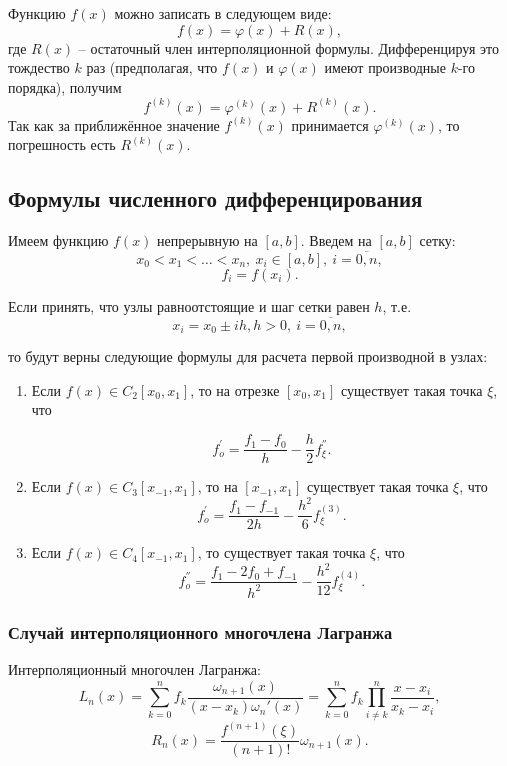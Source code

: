 \documentclass[
11pt,
master, %
subf, %
href, %
colorlinks=true, %
times, %
]{disser}
\begin{document}
Функцию $f(x)$ можно записать в следующем виде:
$$f(x) = \varphi(x) + R(x),$$
где $R(x)$ -- остаточный член интерполяционной формулы. Дифференцируя это тождество $k$ раз (предполагая, что $f(x)$ и $\varphi(x)$ имеют производные $k$-го порядка), получим
$$f^{(k)}(x) = \varphi^{(k)}(x) + R^{(k)}(x).$$
Так как за приближённое значение $f^{(k)}(x)$ принимается $\varphi^{(k)}(x)$, то погрешность есть $R^{(k)}(x)$.

\subsection{Формулы численного дифференцирования}
Имеем функцию $f(x)$ непрерывную на $[a,b]$. Введем на $[a,b]$ сетку:
$$x_0<x_1<\ldots<x_n, ~ x_i\in[a,b], ~ i=\overline{0,n},$$
$$f_i = f(x_i).$$

Если принять, что узлы равноотстоящие и шаг сетки равен $h$, т.е.
\begin{equation}
x_i=x_0 \pm ih, h>0, ~ i=\overline{0,n},
\end{equation}

то будут верны следующие формулы для расчета первой производной в узлах:

\begin{enumerate}

\item Если $f(x) \in C_2 [x_0, x_1]$, то на отрезке $[x_0,x_1]$ существует такая точка $\xi$, что

\begin{equation}
f_o^{'}=\frac{f_1-f_0}{h}-\frac{h}{2}f^{''}_{\xi}.
\end{equation}

\item Если  $f(x) \in C_3 [x_{-1}, x_1]$, то на $[x_{-1}, x_1]$ существует такая точка $\xi$, что
\begin{equation}
f_o^{'}=\frac{f_{1}-f_{-1}}{2h}-\frac{h^2}{6}f^{(3)}_{\xi}.
\end{equation}


\item Если $f(x) \in C_4 [x_{-1}, x_1]$, то существует такая точка $\xi$, что
\begin{equation}
f_o^{''}=\frac{f_{1}-2f_0+f_{-1}}{h^2}-\frac{h^2}{12}f^{(4)}_{\xi}.
\end{equation}

\end{enumerate}



\subsubsection{Случай интерполяционного многочлена Лагранжа}
Интерполяционный многочлен Лагранжа:
$$L_n(x) = \sum_{k=0}^{n}f_k\frac{\omega_{n+1}(x)}{(x-x_k)\omega_n'(x)} = \sum_{k=0}^{n}f_k\prod_{i\neq k}^{n}\frac{x-x_i}{x_k-x_i},$$
$$R_n(x) = \frac{f^{(n+1)}(\xi)}{(n+1)!}\omega_{n+1}(x).$$\\
\end{document}
